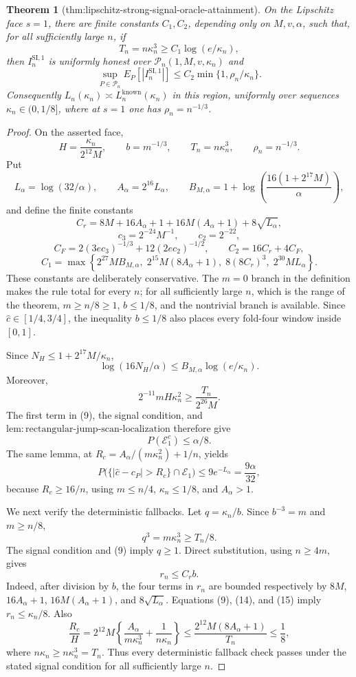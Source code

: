 \documentclass{article}
\newtheorem{theorem}{Theorem}
\begin{document}
\begin{theorem}[thm:lipschitz-strong-signal-oracle-attainment]\label{thm:lipschitz-strong-signal-oracle-attainment}
On the Lipschitz face \(s=1\), there are finite constants
\(C_1,C_2\), depending only on \(M,v,\alpha\), such that, for all
sufficiently large \(n\), if
\[
 T_n=n\kappa_n^3\ge C_1\log(e/\kappa_n),
\]
then \(I_n^{\mathrm{SI},1}\) is uniformly honest over
\(\mathcal P_n(1,M,v,\kappa_n)\) and
\[
 \sup_{P\in\mathcal P_n}E_P[|I_n^{\mathrm{SI},1}|]
 \le C_2\min\{1,\rho_n/\kappa_n\}.
\]
Consequently
\(L_n(\kappa_n)\asymp L_n^{\mathrm{known}}(\kappa_n)\) in this
region, uniformly over sequences \(\kappa_n\in(0,1/8]\), where at
\(s=1\) one has \(\rho_n=n^{-1/3}\).
\end{theorem}
\begin{proof}
On the asserted face,
\[
 H=\frac{\kappa_n}{2^{12}M},\qquad
 b=m^{-1/3},\qquad
 T_n=n\kappa_n^3,\qquad
 \rho_n=n^{-1/3}. \tag{8}
\]
Put
\[
 L_\alpha=\log(32/\alpha),\qquad A_\alpha=2^{16}L_\alpha,
 \qquad
 B_{M,\alpha}=1+\log\!\left(
   \frac{16(1+2^{17}M)}{\alpha}\right),
\]
and define the finite constants
\[
 C_r=8M+16A_\alpha+1+16M(A_\alpha+1)+8\sqrt{L_\alpha},
\]
\[
 c_3=2^{-24}M^{-1},\qquad c_2=2^{-22},
\]
\[
 C_F=2(3ec_3)^{-1/3}+12(2ec_2)^{-1/2},
 \qquad C_2=16C_r+4C_F,
\]
\[
 C_1=\max\left\{
 2^{27}MB_{M,\alpha},\;
 2^{15}M(8A_\alpha+1),\;
 8(8C_r)^3,\;
 2^{30}ML_\alpha
 \right\}. \tag{9}
\]
These constants are deliberately conservative.  The \(m=0\) branch
in the definition makes the rule total for every \(n\); for all
sufficiently large \(n\), which is the range of the theorem,
\(m\ge n/8\ge1\), \(b\le1/8\), and the nontrivial branch is available.
Since \(\widehat c\in[1/4,3/4]\), the inequality \(b\le1/8\) also
places every fold-four window inside \([0,1]\).

Since \(N_H\le1+2^{17}M/\kappa_n\),
\[
 \log(16N_H/\alpha)
 \le B_{M,\alpha}\log(e/\kappa_n). \tag{10}
\]
Moreover,
\[
 2^{-11}mH\kappa_n^2
 \ge\frac{T_n}{2^{26}M}. \tag{11}
\]
The first term in (9), the signal condition, and
\(\mathrm{lem:rectangular\mbox{-}jump\mbox{-}scan\mbox{-}localization}\)
therefore give
\[
 P(\mathcal E_1^c)\le\alpha/8. \tag{12}
\]
The same lemma, at
\(R_c=A_\alpha/(m\kappa_n^2)+1/n\), yields
\[
 P\bigl(\{|\widehat c-c_P|>R_c\}\cap\mathcal E_1\bigr)
 \le9e^{-L_\alpha}=\frac{9\alpha}{32}, \tag{13}
\]
because \(R_c\ge16/n\), using \(m\le n/4\),
\(\kappa_n\le1/8\), and \(A_\alpha>1\).

We next verify the deterministic fallbacks.  Let
\(q=\kappa_n/b\).  Since \(b^{-3}=m\) and \(m\ge n/8\),
\[
 q^3=m\kappa_n^3\ge T_n/8. \tag{14}
\]
The signal condition and (9) imply \(q\ge1\).  Direct substitution,
using \(n\ge4m\), gives
\[
 r_n\le C_rb. \tag{15}
\]
Indeed, after division by \(b\), the four terms in \(r_n\) are bounded
respectively by \(8M\), \(16A_\alpha+1\),
\(16M(A_\alpha+1)\), and \(8\sqrt{L_\alpha}\).  Equations (9),
(14), and (15) imply \(r_n\le\kappa_n/8\).  Also
\[
 \frac{R_c}{H}
 =2^{12}M\left\{
 \frac{A_\alpha}{m\kappa_n^3}+\frac1{n\kappa_n}
 \right\}
 \le\frac{2^{12}M(8A_\alpha+1)}{T_n}
 \le\frac18, \tag{16}
\]
where \(n\kappa_n\ge n\kappa_n^3=T_n\).  Thus every deterministic
fallback check passes under the stated signal condition for all
sufficiently large \(n\).


\end{proof}
\end{document}
